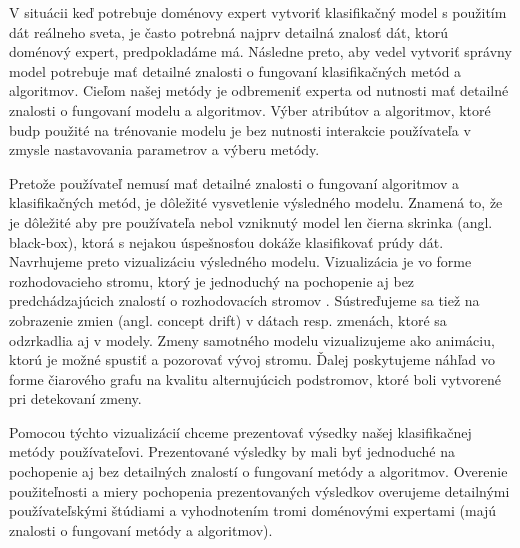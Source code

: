 V situácii keď potrebuje doménovy expert vytvoriť klasifikačný model s použitím dát reálneho sveta, je často potrebná najprv detailná znalosť dát, ktorú doménový expert, predpokladáme má.  Následne preto, aby vedel vytvoriť správny model potrebuje mať detailné znalosti o fungovaní klasifikačných metód a algoritmov. Cieľom našej metódy je odbremeniť experta od nutnosti mať detailné znalosti o fungovaní modelu a algoritmov. Výber atribútov a algoritmov, ktoré budp použité na trénovanie modelu je bez nutnosti interakcie používateľa v zmysle nastavovania parametrov a výberu metódy. 
\par
Pretože používateľ nemusí mať detailné znalosti o fungovaní algoritmov a klasifikačných metód, je dôležité vysvetlenie výsledného modelu. Znamená to, že je dôležité aby pre používateľa nebol vzniknutý model len čierna skrinka (angl. black-box), ktorá s nejakou úspešnosťou dokáže klasifikovať prúdy dát. Navrhujeme preto vizualizáciu výsledného modelu. Vizualizácia je vo forme rozhodovacieho stromu, ktorý je jednoduchý na pochopenie aj bez predchádzajúcich znalostí o rozhodovacích stromov \citep{nguyen2015survey}. Sústreďujeme sa tiež na zobrazenie zmien (angl. concept drift) v dátach resp. zmenách, ktoré sa odzrkadlia aj v modely. Zmeny samotného modelu vizualizujeme ako animáciu, ktorú je možné spustiť a pozorovať vývoj stromu. Ďalej poskytujeme náhľad vo forme čiarového grafu na kvalitu alternujúcich podstromov, ktoré boli vytvorené pri detekovaní zmeny.
\par
Pomocou týchto vizualizácií chceme prezentovať výsedky našej klasifikačnej metódy používateľovi. Prezentované výsledky by mali byť jednoduché na pochopenie aj bez detailných znalostí o fungovaní metódy a algoritmov. Overenie použiteľnosti a miery pochopenia prezentovaných výsledkov overujeme detailnými používateľskými štúdiami a vyhodnotením tromi doménovými expertami (majú znalosti o fungovaní metódy a algoritmov). 


